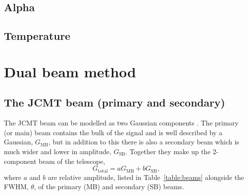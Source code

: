 \subsection{Alpha}
\subsection{Temperature}



\section{Dual beam method}
\subsection{The JCMT beam (primary and secondary)}

The JCMT beam can be modelled as two Gaussian components \citep{Drabek:2012uq, 
Dempsey:2013uq}. The primary (or main) beam contains the bulk of the signal and is 
well described by a Gaussian, $G_{\mathrm{MB}}$, but in addition to this there is also 
a secondary beam which is much wider and lower in amplitude, $G_{\mathrm{SB}}$. 
Together they make up the 2-component beam of the telescope, 
\begin{equation}
G_{\mathrm{total}}=a G_{\mathrm{MB}} + b G_{\mathrm{SB}}, \label{eqn:effbeam} 
\end{equation}
where $a$ and $b$ are relative amplitude, listed in Table~\ref{table:beams} 
alongside the FWHM, $\theta$, of the primary (MB) and secondary (SB) beams.   

